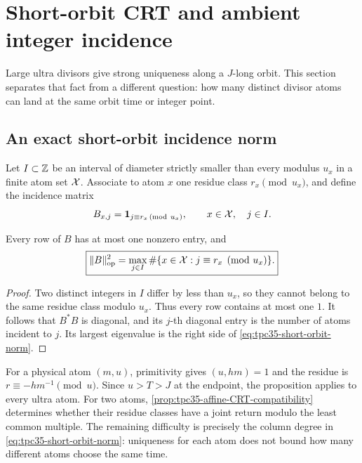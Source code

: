 \section{Short-orbit CRT and ambient integer incidence}
\label{sec:tpc35-integer-incidence}

Large ultra divisors give strong uniqueness along a \(J\)-long orbit.
This section separates that fact from a different question: how many
distinct divisor atoms can land at the same orbit time or integer point.

\subsection{An exact short-orbit incidence norm}

Let \(I\subset\mathbb Z\) be an interval of diameter strictly smaller than every
modulus \(u_x\) in a finite atom set \(\mathcal X\).  Associate to atom \(x\) one
residue class \(r_x\pmod{u_x}\), and define the incidence matrix
\begin{equation}
 B_{x,j}=\mathbf 1_{j\equiv r_x\,({\rm mod}\ u_x)},
 \qquad x\in\mathcal X,\quad j\in I.
 \label{eq:tpc35-short-orbit-matrix}
\end{equation}

\begin{proposition}
\label{prop:tpc35-short-orbit-norm}
Every row of \(B\) has at most one nonzero entry, and
\begin{equation}
 \boxed{
 \|B\|_{\operatorname{op}}^2
 =\max_{j\in I}\#\{x\in\mathcal X:j\equiv r_x\pmod{u_x}\}.}
 \label{eq:tpc35-short-orbit-norm}
\end{equation}
\end{proposition}

\begin{proof}
Two distinct integers in \(I\) differ by less than \(u_x\), so they cannot
belong to the same residue class modulo \(u_x\).  Thus every row contains
at most one \(1\).  It follows that \(B^*B\) is diagonal, and its \(j\)-th
diagonal entry is the number of atoms incident to \(j\).  Its largest
eigenvalue is the right side of \eqref{eq:tpc35-short-orbit-norm}.
\end{proof}

For a physical atom \((m,u)\), primitivity gives
\((u,hm)=1\) and the residue is \(r\equiv-hm^{-1}\pmod u\).  Since
\(u>T>J\) at the endpoint, the proposition applies to every ultra atom.
For two atoms, \cref{prop:tpc35-affine-CRT-compatibility} determines
whether their residue classes have a joint return modulo the least common
multiple.  The remaining difficulty is precisely the column degree in
\eqref{eq:tpc35-short-orbit-norm}: uniqueness for each atom does not bound
how many different atoms choose the same time.

